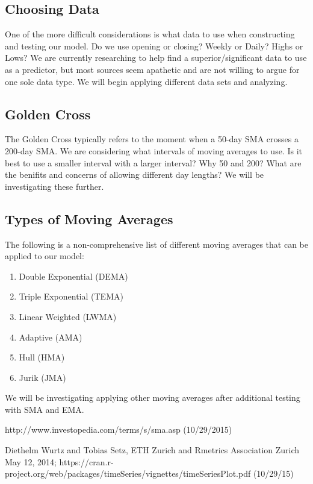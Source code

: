 \documentclass[11pt]{article}
\begin{document}
\subsection*{Choosing Data}
One of the more difficult considerations is what data to use when constructing and testing our model. Do we use opening or closing? Weekly or Daily? Highs or Lows? We are currently researching to help find a superior/significant data to use as a predictor, but most sources seem apathetic and are not willing to argue for one sole data type. We will begin applying different data sets and analyzing.

\subsection*{Golden Cross}
The Golden Cross typically refers to the moment when a 50-day SMA crosses a 200-day SMA. We are considering what intervals of moving averages to use. Is it best to use a smaller interval with a larger interval? Why 50 and 200? What are the benifits and concerns of allowing different day lengths? We will be investigating these further.

\subsection*{Types of Moving Averages}
The following is a non-comprehensive list of different moving averages that can be applied to our model:
\begin{enumerate}
	\item Double Exponential (DEMA)
	\item Triple Exponential (TEMA)
	\item Linear Weighted (LWMA)
	\item Adaptive (AMA)
	\item Hull (HMA)
	\item Jurik (JMA)
\end{enumerate}
We will be investigating applying other moving averages after additional testing with SMA and EMA.


\begin{thebibliography}{20}

 http://www.investopedia.com/terms/s/sma.asp (10/29/2015)

 Diethelm Wurtz and Tobias Setz, ETH Zurich and Rmetrics Association Zurich May 12, 2014; https://cran.r-project.org/web/packages/timeSeries/vignettes/timeSeriesPlot.pdf (10/29/15)

\end{thebibliography}
\end{document}
